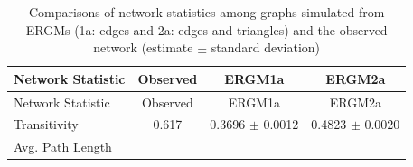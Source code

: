\documentclass[12pt,twoside]{amherstthesis}
\begin{document}
  \begin{longtable}[]{@{}lccc@{}}
  \caption{Comparisons of network statistics among graphs simulated from
  ERGMs (1a: edges and 2a: edges and triangles) and the observed network
  (estimate \(\pm\) standard deviation)
  \label{tab:ergm1a2a}}\tabularnewline
  \toprule
  \begin{minipage}[b]{0.20\columnwidth}\raggedright\strut
  Network Statistic\strut
  \end{minipage} & \begin{minipage}[b]{0.12\columnwidth}\centering\strut
  Observed\strut
  \end{minipage} & \begin{minipage}[b]{0.27\columnwidth}\centering\strut
  ERGM1a\strut
  \end{minipage} & \begin{minipage}[b]{0.29\columnwidth}\centering\strut
  ERGM2a\strut
  \end{minipage}\tabularnewline
  \midrule
  \endfirsthead
  \toprule
  \begin{minipage}[b]{0.20\columnwidth}\raggedright\strut
  Network Statistic\strut
  \end{minipage} & \begin{minipage}[b]{0.12\columnwidth}\centering\strut
  Observed\strut
  \end{minipage} & \begin{minipage}[b]{0.27\columnwidth}\centering\strut
  ERGM1a\strut
  \end{minipage} & \begin{minipage}[b]{0.29\columnwidth}\centering\strut
  ERGM2a\strut
  \end{minipage}\tabularnewline
  \midrule
  \endhead
  \begin{minipage}[t]{0.20\columnwidth}\raggedright\strut
  Transitivity\strut
  \end{minipage} & \begin{minipage}[t]{0.12\columnwidth}\centering\strut
  0.617\strut
  \end{minipage} & \begin{minipage}[t]{0.27\columnwidth}\centering\strut
  0.3696 \(\pm\) 0.0012\strut
  \end{minipage} & \begin{minipage}[t]{0.29\columnwidth}\centering\strut
  0.4823 \(\pm\) 0.0020\strut
  \end{minipage}\tabularnewline
  \begin{minipage}[t]{0.20\columnwidth}\raggedright\strut
  Avg. Path Length\strut

\end{minipage}
\end{longtable}
\end{document}
